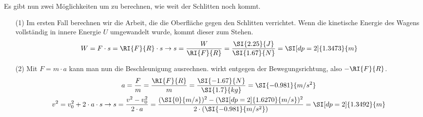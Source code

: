 \begin{aufgabe}
\begin{loesung}
\begin{itemize}
	Es gibt nun zwei Möglichkeiten um zu berechnen, wie weit der Schlitten noch kommt.
	\begin{itemize}
		\item [(1)] Im ersten Fall berechnen wir die Arbeit, die die Oberfläche gegen den Schlitten verrichtet.
			Wenn die kinetische Energie des Wagens vollständig in innere Energie $U$ umgewandelt wurde, kommt dieser zum Stehen.
			\begin{eqnarray*}
				W=F\cdot s =\RI{F}{R}\cdot s \to s =\frac{W}{\RI{F}{R}}=\frac{\SI{2.25}{J}}{\SI{1.67}{N}}=\SI[dp=2]{1.3473}{m}
			\end{eqnarray*}
		\item[(2)]			
				Mit $F=m\cdot a$ kann man nun die Beschleunigung ausrechnen.  wirkt entgegen der Bewegungsrichtung, also $-\RI{F}{R}$.
\begin{gather*}
	a=\frac{F}{m} =\frac{\RI{F}{R}}{m}=\frac{\SI{-1.67}{N}}{\SI{1.7}{kg}}=\SI{-0.981}{m/s^2}\\
	v^2=v_0^2+2\cdot a\cdot s \to s=\frac{v^2-v_0^2}{2\cdot a}=\frac{(\SI{0}{m/s})^2-(\SI[dp=2]{1.6270}{m/s})^2}{2\cdot(\SI{-0.981}{m/s^2})}=\SI[dp=2]{1.3492}{m}
\end{gather*}

	\end{itemize}
		\end{itemize}
	\end{loesung}

\end{aufgabe}



